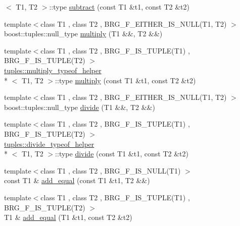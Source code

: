 \begin{DoxyCompactItemize}
$<$ T1, T2 $>$\-::type \hyperlink{namespaceIceBRG_a26622f7657144b52b7d18be7033fe5f2}{subtract} (const T1 \&t1, const T2 \&t2)
\item 
{\footnotesize template$<$class T1 , class T2 , B\-R\-G\-\_\-\-F\-\_\-\-E\-I\-T\-H\-E\-R\-\_\-\-I\-S\-\_\-\-N\-U\-L\-L(\-T1, T2) $>$ }\\boost\-::tuples\-::null\-\_\-type \hyperlink{namespaceIceBRG_ab535c998baac3ffc8412fdbae750b7d1}{multiply} (T1 \&\&, T2 \&\&)
\item 
{\footnotesize template$<$class T1 , class T2 , B\-R\-G\-\_\-\-F\-\_\-\-I\-S\-\_\-\-T\-U\-P\-L\-E(\-T1) , B\-R\-G\-\_\-\-F\-\_\-\-I\-S\-\_\-\-T\-U\-P\-L\-E(\-T2) $>$ }\\\hyperlink{namespaceIceBRG_1_1tuples_structIceBRG_1_1tuples_1_1multiply__typeof__helper}{tuples\-::multiply\-\_\-typeof\-\_\-helper}\\*
$<$ T1, T2 $>$\-::type \hyperlink{namespaceIceBRG_ad579274ad3c2e2455f1116bfdcf7544a}{multiply} (const T1 \&t1, const T2 \&t2)
\item 
{\footnotesize template$<$class T1 , class T2 , B\-R\-G\-\_\-\-F\-\_\-\-E\-I\-T\-H\-E\-R\-\_\-\-I\-S\-\_\-\-N\-U\-L\-L(\-T1, T2) $>$ }\\boost\-::tuples\-::null\-\_\-type \hyperlink{namespaceIceBRG_ab43969c262e2747108975f52fc9b47fd}{divide} (T1 \&\&, T2 \&\&)
\item 
{\footnotesize template$<$class T1 , class T2 , B\-R\-G\-\_\-\-F\-\_\-\-I\-S\-\_\-\-T\-U\-P\-L\-E(\-T1) , B\-R\-G\-\_\-\-F\-\_\-\-I\-S\-\_\-\-T\-U\-P\-L\-E(\-T2) $>$ }\\\hyperlink{namespaceIceBRG_1_1tuples_structIceBRG_1_1tuples_1_1divide__typeof__helper}{tuples\-::divide\-\_\-typeof\-\_\-helper}\\*
$<$ T1, T2 $>$\-::type \hyperlink{namespaceIceBRG_a08411d216e202daf8f5bd9ff54065b3e}{divide} (const T1 \&t1, const T2 \&t2)
\item 
{\footnotesize template$<$class T1 , class T2 , B\-R\-G\-\_\-\-F\-\_\-\-I\-S\-\_\-\-N\-U\-L\-L(\-T1) $>$ }\\const T1 \& \hyperlink{namespaceIceBRG_a06f5e1f4699ca69ee50e614fc314fc61}{add\-\_\-equal} (const T1 \&t1, T2 \&\&)
\item 
{\footnotesize template$<$class T1 , class T2 , B\-R\-G\-\_\-\-F\-\_\-\-I\-S\-\_\-\-T\-U\-P\-L\-E(\-T1) , B\-R\-G\-\_\-\-F\-\_\-\-I\-S\-\_\-\-T\-U\-P\-L\-E(\-T2) $>$ }\\T1 \& \hyperlink{namespaceIceBRG_abb979116386359a9542c9bca10712bc2}{add\-\_\-equal} (T1 \&t1, const T2 \&t2)

\end{DoxyCompactItemize}
